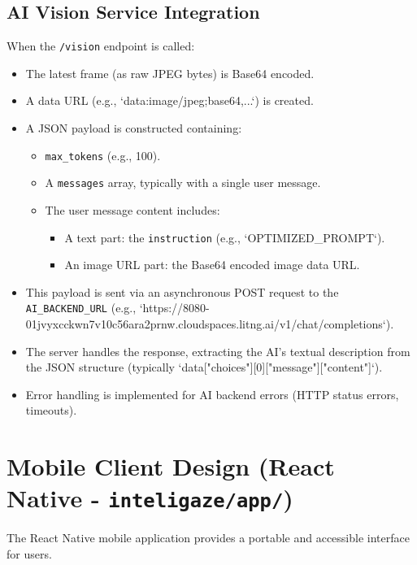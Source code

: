 \documentclass[12pt, a4paper]{report}
\begin{document}
\subsection{AI Vision Service Integration}
When the \texttt{/vision} endpoint is called:
\begin{itemize}
    \item The latest frame (as raw JPEG bytes) is Base64 encoded.
    \item A data URL (e.g., `data:image/jpeg;base64,...`) is created.
    \item A JSON payload is constructed containing:
        \begin{itemize}
            \item \texttt{max\_tokens} (e.g., 100).
            \item A \texttt{messages} array, typically with a single user message.
            \item The user message content includes:
                \begin{itemize}
                    \item A text part: the \texttt{instruction} (e.g., `OPTIMIZED\_PROMPT`).
                    \item An image URL part: the Base64 encoded image data URL.
                \end{itemize}
        \end{itemize}
    \item This payload is sent via an asynchronous POST request to the \texttt{AI\_BACKEND\_URL} (e.g., `https://8080-01jvyxcckwn7v10c56ara2prnw.cloudspaces.litng.ai/v1/chat/completions`).
    \item The server handles the response, extracting the AI's textual description from the JSON structure (typically `data["choices"][0]["message"]["content"]`).
    \item Error handling is implemented for AI backend errors (HTTP status errors, timeouts).
\end{itemize}

\section{Mobile Client Design (React Native - \texttt{inteligaze/app/})}
The React Native mobile application provides a portable and accessible interface for users.
\end{document}
